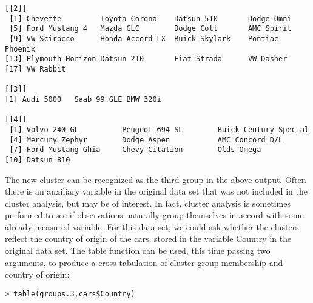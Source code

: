 {\begin{framed}
\begin{verbatim}
[[2]]
 [1] Chevette         Toyota Corona    Datsun 510       Dodge Omni
 [5] Ford Mustang 4   Mazda GLC        Dodge Colt       AMC Spirit
 [9] VW Scirocco      Honda Accord LX  Buick Skylark    Pontiac Phoenix
[13] Plymouth Horizon Datsun 210       Fiat Strada      VW Dasher
[17] VW Rabbit

[[3]]
[1] Audi 5000   Saab 99 GLE BMW 320i

[[4]]
 [1] Volvo 240 GL          Peugeot 694 SL        Buick Century Special
 [4] Mercury Zephyr        Dodge Aspen           AMC Concord D/L
 [7] Ford Mustang Ghia     Chevy Citation        Olds Omega
[10] Datsun 810
\end{verbatim}
\end{framed}

The new cluster can be recognized as the third group in the above output.
Often there is an auxiliary variable in the original data set that was not included in the cluster analysis, but may be of interest. In fact, cluster analysis is sometimes performed to see if observations naturally group themselves in accord with some already measured variable. For this data set, we could ask whether the clusters reflect the country of origin of the cars, stored in the variable Country in the original data set. The table function can be used, this time passing two arguments, to produce a cross-tabulation of cluster group membership and country of origin:
\begin{framed}
\begin{verbatim}
> table(groups.3,cars$Country)


\end{verbatim}
\end{framed}}
